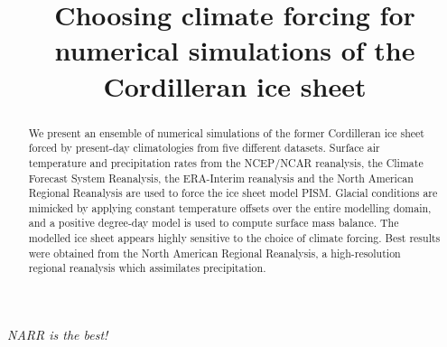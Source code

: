 \documentclass[tc, ms, noauthor]{copernicus}
\begin{document}
\title{Choosing climate forcing for numerical simulations of the Cordilleran ice sheet}


\received{}
\pubdiscuss{}
\revised{}
\accepted{}
\published{}

\maketitle

\begin{abstract}
We present an ensemble of numerical simulations of the former Cordilleran ice sheet forced by present-day climatologies from five different datasets. Surface air temperature and precipitation rates from the NCEP/NCAR reanalysis, the Climate Forecast System Reanalysis, the ERA-Interim reanalysis and the North American Regional Reanalysis are used to force the ice sheet model PISM. Glacial conditions are mimicked by applying constant temperature offsets over the entire modelling domain, and a positive degree-day model is used to compute surface mass balance. The modelled ice sheet appears highly sensitive to the choice of climate forcing. Best results were obtained from the North American Regional Reanalysis, a high-resolution regional reanalysis which assimilates precipitation.
\end{abstract}




%
%

\conclusions  %
\label{sec:conclusion}
\emph{NARR is the best!}




\end{document}
